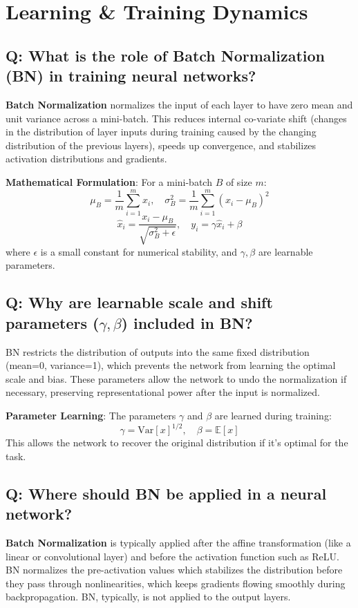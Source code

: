\section{Learning \& Training Dynamics}

\subsection*{\textcolor{primaryteal}{Q: What is the role of Batch Normalization (BN) in training neural networks?}}
\textbf{Batch Normalization} normalizes the input of each layer to have zero mean and unit variance across a mini-batch. This reduces internal co-variate shift (changes in the distribution of layer inputs during training caused by the changing distribution of the previous layers), speeds up convergence, and stabilizes activation distributions and gradients.

\textbf{Mathematical Formulation}: For a mini-batch $B$ of size $m$:
\[
	\mu_B = \frac{1}{m} \sum_{i=1}^{m} x_i, \quad \sigma_B^2 = \frac{1}{m} \sum_{i=1}^{m} (x_i - \mu_B)^2
\]
\[
	\hat{x}_i = \frac{x_i - \mu_B}{\sqrt{\sigma_B^2 + \epsilon}}, \quad y_i = \gamma \hat{x}_i + \beta
\]
where $\epsilon$ is a small constant for numerical stability, and $\gamma, \beta$ are learnable parameters.

\subsection*{\textcolor{primaryteal}{Q: Why are learnable scale and shift parameters ($\gamma, \beta$) included in BN?}}
BN restricts the distribution of outputs into the same fixed distribution (mean=0, variance=1), which prevents the network from learning the optimal scale and bias. These parameters allow the network to undo the normalization if necessary, preserving representational power after the input is normalized.

\textbf{Parameter Learning}: The parameters $\gamma$ and $\beta$ are learned during training:
\[
	\gamma = \text{Var}[x]^{1/2}, \quad \beta = \mathbb{E}[x]
\]
This allows the network to recover the original distribution if it's optimal for the task.

\subsection*{\textcolor{primaryteal}{Q: Where should BN be applied in a neural network?}}
\textbf{Batch Normalization} is typically applied after the affine transformation (like a linear or convolutional layer) and before the activation function such as ReLU. BN normalizes the pre-activation values which stabilizes the distribution before they pass through nonlinearities, which keeps gradients flowing smoothly during backpropagation. BN, typically, is not applied to the output layers.

